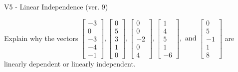 \begin{exercise}
  \begin{exerciseTitle}V5 - Linear Independence (ver. 9)\end{exerciseTitle}
  \begin{exerciseStatement}
    Explain why the vectors \(\left[\begin{array}{r}
-3 \\
0 \\
-3 \\
-4 \\
-1
\end{array}\right] , \left[\begin{array}{r}
0 \\
5 \\
3 \\
1 \\
0
\end{array}\right] , \left[\begin{array}{r}
0 \\
0 \\
-2 \\
0 \\
4
\end{array}\right] , \left[\begin{array}{r}
1 \\
4 \\
5 \\
1 \\
-6
\end{array}\right] , \text{ and } \left[\begin{array}{r}
0 \\
5 \\
-1 \\
1 \\
8
\end{array}\right]\) are linearly dependent or linearly independent.	



\end{exerciseStatement}
\end{exercise}
